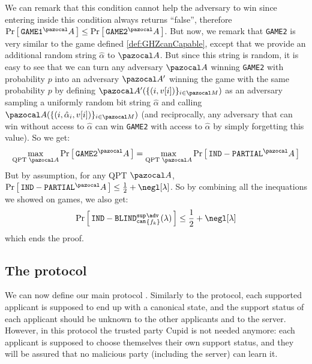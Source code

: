 \begin{proofE}
\begin {pcimage}
{{      }}
  \end{pcimage}
  We can remark that this condition cannot help the adversary to win since entering inside this condition always returns ``false'', therefore $\pr{\texttt{GAME1}^\cA} \leq \pr{\texttt{GAME2}^\cA}$. But now, we remark that \texttt{GAME2} is very similar to the game \INDPARTIAL{} defined \cref{def:GHZcanCapable}, except that we provide an additional random string $\hat{\alpha}$ to $\cA$. But since this string is random, it is easy to see that we can turn any adversary $\cA$ winning \texttt{GAME2} with probability $p$ into an adversary $\cA'$ winning the game \INDPARTIAL{} with the same probability $p$ by defining $\cA'(\{(i,v[i])\}_{i \in \cM})$ as an adversary sampling a uniformly random bit string $\hat{\alpha}$ and calling $\cA(\{(i,\hat{\alpha}_i,v[i])\}_{i \in \cM})$ (and reciprocally, any adversary that can win \INDPARTIAL{} without access to $\hat{\alpha}$ can win  \texttt{GAME2} with access to $\hat{\alpha}$ by simply forgetting this value). So we get:
  \begin{align}
    \max_{\text{QPT }\cA}\pr{ \texttt{GAME2}^\cA } = \max_{\text{QPT }\cA}\pr{ \INDPARTIAL{}^\cA }
  \end{align}
  But by assumption, for any QPT $\cA$, $\pr{ \INDPARTIAL{}^\cA } \leq \frac{1}{2} + \negl[\lambda]$. So by combining all the inequations we showed on games, we also get:
  \begin{align}
    \pr{\INDBLINDCANSUP{}_{\{f_k\}} ^\adv (\lambda)} \leq \frac{1}{2} + \negl[\lambda]
  \end{align}
  which ends the proof.
\end{proofE}

\subsection{The protocol \authBlindCanDist{}}\label{subsec:authBlindCanDist}

We can now define our main protocol \authBlindCanDist{}. Similarly to the \blindCanSup{} protocol, each supported applicant is supposed to end up with a canonical \GHZ{} state, and the support status of each applicant should be unknown to the other applicants and to the server. However, in this protocol the trusted party Cupid is not needed anymore: each applicant is supposed to choose themselves their own support status, and they will be assured that no malicious party (including the server) can learn it.

